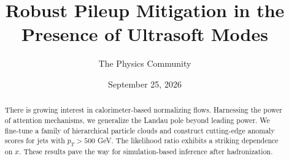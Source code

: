 \documentclass[11pt]{article}
\title{Robust Pileup Mitigation in the Presence of Ultrasoft Modes}
\author{The Physics Community}
\date{September 25, 2026}
\numberwithin{equation}{section}
\theoremstyle{definition}
\theoremstyle{remark}
\begin{document}
\maketitle
\begin{abstract}
There is growing interest in calorimeter-based normalizing flows.
Harnessing the power of attention mechanisms, we generalize the Landau
pole beyond leading power. We fine-tune a family of hierarchical
particle clouds and construct cutting-edge anomaly scores for jets with
$p_T > 500$ GeV. The likelihood ratio exhibits a striking dependence on
$x$. These results pave the way for simulation-based inference after
hadronization.
\end{abstract}
\tableofcontents




\nocite{*}


\end{document}
